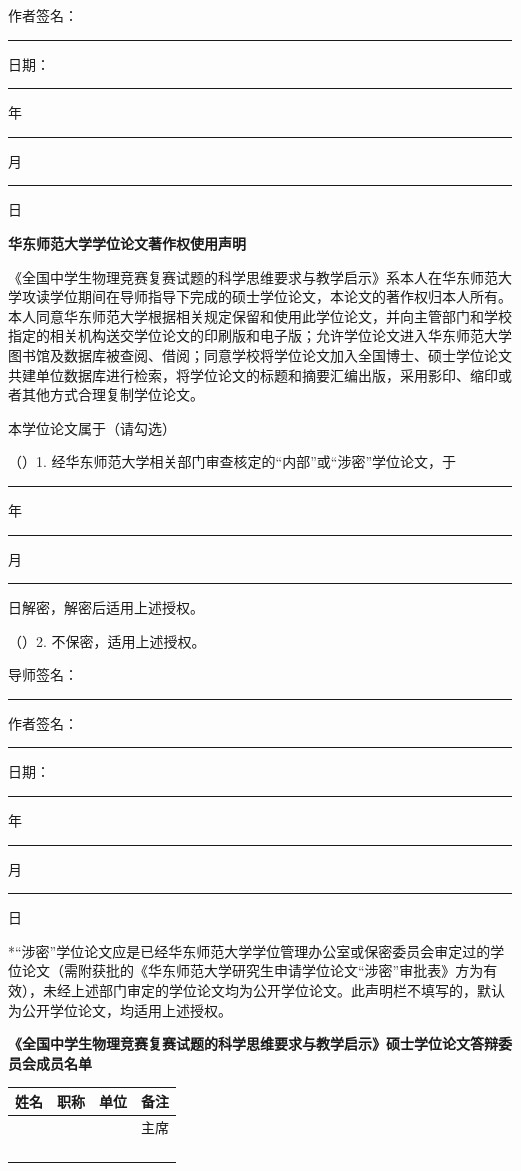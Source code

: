 \documentclass[
  12pt,
  a4paper,twoside,openany]{ctexbook}
\renewcommand{\arraystretch}{1.22}
\begin{document}
\vspace{0.8cm}
\noindent 作者签名：\rule{4.0cm}{0.4pt}\hfill 日期：\rule{1.0cm}{0.4pt}年\rule{0.8cm}{0.4pt}月\rule{0.8cm}{0.4pt}日

\vspace{1.4cm}
\begin{center}
{\heiti{}\bfseries 华东师范大学学位论文著作权使用声明\par}
\end{center}
\vspace{0.6cm}

《全国中学生物理竞赛复赛试题的科学思维要求与教学启示》系本人在华东师范大学攻读学位期间在导师指导下完成的硕士学位论文，本论文的著作权归本人所有。本人同意华东师范大学根据相关规定保留和使用此学位论文，并向主管部门和学校指定的相关机构送交学位论文的印刷版和电子版；允许学位论文进入华东师范大学图书馆及数据库被查阅、借阅；同意学校将学位论文加入全国博士、硕士学位论文共建单位数据库进行检索，将学位论文的标题和摘要汇编出版，采用影印、缩印或者其他方式合理复制学位论文。

本学位论文属于（请勾选）

（\quad）1. 经华东师范大学相关部门审查核定的“内部”或“涉密”学位论文，于\rule{1.0cm}{0.4pt}年\rule{0.8cm}{0.4pt}月\rule{0.8cm}{0.4pt}日解密，解密后适用上述授权。

（\quad）2. 不保密，适用上述授权。

\vspace{0.6cm}
\noindent 导师签名：\rule{3.6cm}{0.4pt}\hfill 作者签名：\rule{3.6cm}{0.4pt}

\vspace{0.4cm}
\hfill 日期：\rule{1.0cm}{0.4pt}年\rule{0.8cm}{0.4pt}月\rule{0.8cm}{0.4pt}日

\vfill
{ *“涉密”学位论文应是已经华东师范大学学位管理办公室或保密委员会审定过的学位论文（需附获批的《华东师范大学研究生申请学位论文“涉密”审批表》方为有效），未经上述部门审定的学位论文均为公开学位论文。此声明栏不填写的，默认为公开学位论文，均适用上述授权。\par}
\endgroup

\clearpage
\thispagestyle{empty}
\begin{center}
{\heiti{}\bfseries 《全国中学生物理竞赛复赛试题的科学思维要求与教学启示》硕士学位论文答辩委员会成员名单\par}
\end{center}
\vspace{1.1cm}
\renewcommand{\arraystretch}{2.0}
\begin{center}
\begin{tabular}{|p{2.5cm}|p{2.6cm}|p{5.6cm}|p{2.3cm}|}
\hline
\centering 姓名 & \centering 职称 & \centering 单位 & \centering\arraybackslash 备注 \\
\hline
 & & & 主席 \\
\hline
 & & & \\
\hline
 & & & \\
\hline
 & & & \\
\hline
 & & & \\
\hline
\end{tabular}
\end{center}
\end{document}
